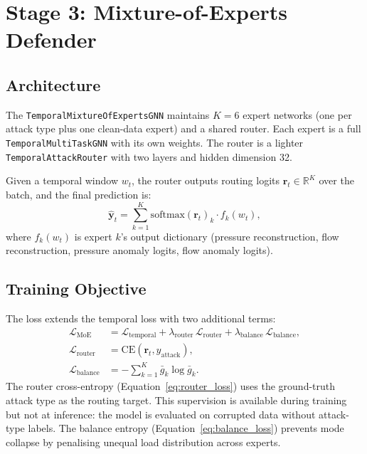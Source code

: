 \section{Stage 3: Mixture-of-Experts Defender}
\label{sec:moe_defender}

\subsection{Architecture}

The \texttt{TemporalMixtureOfExpertsGNN} maintains $K = 6$ expert
networks (one per attack type plus one clean-data expert) and a
shared router. Each expert is a full \texttt{TemporalMultiTaskGNN}
with its own weights. The router is a lighter \texttt{TemporalAttackRouter}
with two \gnn{} layers and hidden dimension 32.

Given a temporal window $w_t$, the router outputs routing logits
$\mathbf{r}_t \in \mathbb{R}^K$ over the batch, and the final
prediction is:
\begin{equation}
  \hat{\mathbf{y}}_t = \sum_{k=1}^K \mathrm{softmax}(\mathbf{r}_t)_k
    \cdot f_k(w_t),
\end{equation}
where $f_k(w_t)$ is expert $k$'s output dictionary (pressure
reconstruction, flow reconstruction, pressure anomaly logits, flow
anomaly logits).

\subsection{Training Objective}

The \moe{} loss extends the temporal loss with two additional terms:
\begin{align}
  \mathcal{L}_\text{MoE} &= \mathcal{L}_\text{temporal}
    + \lambda_\text{router}\,\mathcal{L}_\text{router}
    + \lambda_\text{balance}\,\mathcal{L}_\text{balance}, \\
  \mathcal{L}_\text{router} &= \mathrm{CE}(\mathbf{r}_t, y_\text{attack}),
    \label{eq:router_loss} \\
  \mathcal{L}_\text{balance} &= -\sum_{k=1}^K \bar{g}_k \log \bar{g}_k.
    \label{eq:balance_loss}
\end{align}
The router cross-entropy (Equation~\ref{eq:router_loss}) uses the
ground-truth attack type as the routing target. This supervision is
available during training but not at inference: the model is evaluated
on corrupted data without attack-type labels. The balance entropy
(Equation~\ref{eq:balance_loss}) prevents mode collapse by penalising
unequal load distribution across experts.

